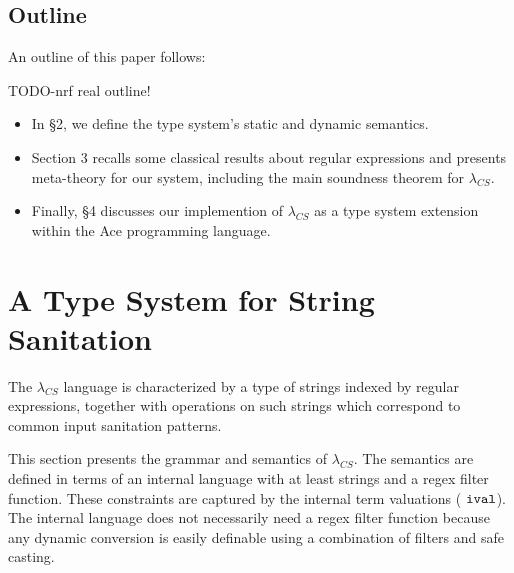 \documentclass[10pt,preprint]{sigplanconf}
\theoremstyle{definition}
\newcommand{\ival}{ \ {\tt ival} }
\newcommand{\lcs}{\lambda_{CS}}
\begin{document}
\subsection{Outline}

An outline of this paper follows:

TODO-nrf real outline!
\begin{itemize}
  \item In \S 2, we define the type system's static and dynamic semantics.
  \item Section 3 recalls some classical results about regular expressions and presents meta-theory for our system, including
    the main soundness theorem for $\lcs$.
  \item Finally, \S 4 discusses our implemention of $\lcs$ as a type system extension  within the Ace programming language.
\end{itemize}

\section{A Type System for String Sanitation}

The $\lcs$ language is characterized by a type of strings indexed by regular
expressions, together with operations on such strings which correspond to common
input sanitation patterns.

This section presents the grammar and semantics of $\lcs$.
The semantics are defined in terms of an internal language with at least strings and a regex filter function.
These constraints are captured by the internal term valuations ($\ival$).
The internal language does not necessarily need a regex filter function because
any dynamic conversion is easily definable using a combination of filters and safe
casting.

%
%
\newcommand{\ereplace}[3]{{\tt replace}[#1](#2,#3)}
\newcommand{\echeck}[2]{{\tt check}[#1](#2)}
\newcommand{\estr}[2]{{\tt str[#1, #2]}}
\newcommand{\estrt}[1]{{\tt strt[#1]}}
\newcommand{\econcat}{+}

\newcommand{\ireplace}[3]{{\tt ireplace}(#1,#2,#3)}
\newcommand{\icheck}[2]{{\tt icheck}(#1, #2)}
\newcommand{\istr}[1]{{{\tt istr}[#1]}}
\newcommand{\istrt}{{\tt istrt}}
\newcommand{\iconcat}{\hat{+}}

\newcommand{\replacefn}[3]{\tt replacement(#1,#2,#3)}
\newcommand{\crl}[3]{{\tt compute\_replacement\_lanugage}(#1,#2,#3)}
\end{document}
